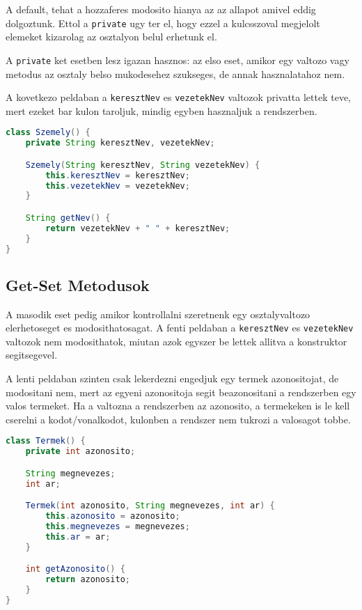 \documentclass{article}
\let\l\lstinline
\begin{document}
A default, tehat a hozzaferes modosito hianya az az allapot amivel eddig dolgoztunk. Ettol a \l{private} ugy ter el, hogy ezzel a kulcsszoval megjelolt elemeket kizarolag az osztalyon belul erhetunk el.

A \l{private} ket esetben lesz igazan hasznos: az elso eset, amikor egy valtozo vagy metodus az osztaly belso mukodesehez szukseges, de annak hasznalatahoz nem.

A kovetkezo peldaban a \l{keresztNev} es \l{vezetekNev} valtozok privatta lettek teve, mert ezeket bar kulon taroljuk, mindig egyben hasznaljuk a rendszerben.

\begin{lstlisting}[language=Java, caption=Privat valtozok]
class Szemely() {
    private String keresztNev, vezetekNev;

    Szemely(String keresztNev, String vezetekNev) {
        this.keresztNev = keresztNev;
        this.vezetekNev = vezetekNev;
    }

    String getNev() {
        return vezetekNev + " " + keresztNev;
    }
}
\end{lstlisting}

\subsection{Get-Set Metodusok}

A masodik eset pedig amikor kontrollalni szeretnenk egy osztalyvaltozo elerhetoseget es modosithatosagat. A fenti peldaban a \l{keresztNev} es \l{vezetekNev} valtozok nem modosithatok, miutan azok egyszer be lettek allitva a konstruktor segitsegevel.

A lenti peldaban szinten csak lekerdezni engedjuk egy termek azonositojat, de modositani nem, mert az egyeni azonositoja segit beazonositani a rendszerben egy valos termeket. Ha a valtozna a rendszerben az azonosito, a termekeken is le kell cserelni a kodot/vonalkodot, kulonben a rendszer nem tukrozi a valosagot tobbe.

\begin{lstlisting}[language=Java, caption=Privat valtozo]
class Termek() {
    private int azonosito;

    String megnevezes;
    int ar;

    Termek(int azonosito, String megnevezes, int ar) {
        this.azonosito = azonosito;
        this.megnevezes = megnevezes;
        this.ar = ar;
    }

    int getAzonosito() {
        return azonosito;
    }
}
\end{lstlisting}
\end{document}
